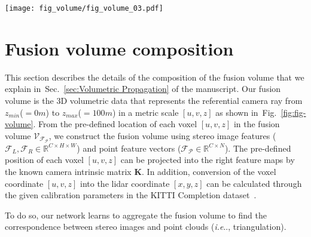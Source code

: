 \documentclass[letterpaper, 10 pt, conference]{ieeeconf}
\makeatletter
\DeclareRobustCommand\onedot{\futurelet\@let@token\@onedot}
\def\@onedot{\ifx\@let@token.\else.\null\fi\xspace}
\def\ie{\emph{i.e}\onedot} \def\Ie{{I.e}\onedot}
\newcommand{\Fref}[1]{Fig.~\textcolor{blue}{\ref{#1}}}
\newcommand{\Sref}[1]{Sec.~\textcolor{blue}{\ref{#1}}}
\makeatother
\begin{document}
\begin{figure*}[!t]
\centering
\texttt{[image: fig\_volume/fig\_volume\_03.pdf]}
\vspace{-2mm}
\caption{\textbf{Visualization of the composition of the fusion volume.} 
Under the known calibration parameters and the baseline between stereo cameras, there is a geometric relation between the location of the voxel $[u,v,z]$ and the feature data from stereo images and point clouds. This geometric fact is utilized for the composition of the fusion volume.}
\vspace{-2mm}
\label{fig:fig-volume}
\end{figure*}
\section{Fusion volume composition}
\label{supp-sec:Fusion volume composition}
This section describes the details of the composition of the fusion volume that we explain in~\Sref{sec:Volumetric Propagation} of the manuscript. Our fusion volume is the 3D volumetric data that represents the referential camera ray from $z_{min}$(${=}0m$) to $z_{max}$(${=}100m$) in a metric scale $[u,v,z]$ as shown in~\Fref{fig:fig-volume}. From the pre-defined location of each voxel $[u,v,z]$ in the fusion volume $\mathcal{V}_{\mathcal{F}_{\mathcal{P}}}$, we construct the fusion volume using stereo image features ($\mathcal{F}_{L}, \mathcal{F}_{R} \in \mathbb{R}^{C \times H \times W}$) and point feature vectors ($\mathcal{F}_{\mathcal{P}} \in \mathbb{R}^{C \times N}$). The pre-defined position of each voxel $[u,v,z]$ can be projected into the right feature maps by the known camera intrinsic matrix $\mathbf{K}$. In addition, conversion of the voxel coordinate $[u,v,z]$ into the lidar coordinate $[x,y,z]$ can be calculated through the given calibration parameters in the KITTI Completion dataset~\cite{kitti-completion}.

To do so, our network learns to aggregate the fusion volume to find the correspondence between stereo images and point clouds (\ie, triangulation). 
\end{document}
